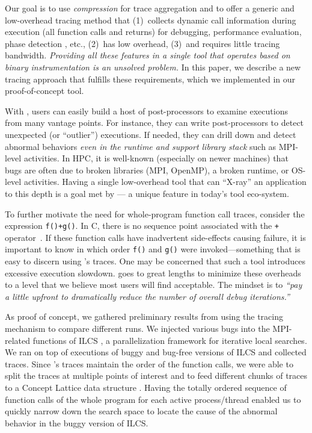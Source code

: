%
Our goal is to use \textit{compression} for trace aggregation and to offer
a generic and low-overhead tracing method that
(1)~collects dynamic call information during execution (all function calls and returns) for debugging, performance evaluation, phase detection \cite{cbb}, etc.,
(2)~has low overhead,
(3)~and requires little tracing bandwidth.
%
{\em Providing all these features in a single tool
that operates based on binary instrumentation
is an unsolved problem.}
%
In this paper, we describe a new tracing approach that fulfills these requirements, which we implemented in our proof-of-concept \parlot tool.


%
With \parlot, users can easily build a host of post-processors to examine
executions from many vantage points.
%
For instance, they can write post-processors
to detect unexpected (or ``outlier'') executions.
%
If needed, they can
drill down and detect abnormal behaviors {\em even in the runtime and
support library stack} such as MPI-level activities.
%
In HPC, it is well-known (especially on newer machines) that bugs are often due to
broken libraries (MPI, OpenMP), a broken runtime, or OS-level activities.
%
Having a single low-overhead tool that can ``X-ray'' an application to this depth is a goal met by \parlot --- a unique feature in today's tool eco-system.

To further motivate the need for whole-program function call
traces, consider the expression {\tt f()+g()}.
%
In C, there is no sequence point associated with the {\tt +}
operator~\cite{sequence-points-in-C}.
%
If these function calls have inadvertent side-effects causing
failure, it is important to know in which order {\tt f()}
and {\tt g()} were invoked---something that is easy to discern using
\parlot 's traces.
%
One may be concerned that such a tool introduces excessive execution slowdown.
%
\parlot goes to great lengths to minimize these overheads to a level that we believe most users will find acceptable. The mindset is to \textit{``pay a little upfront to dramatically reduce the number of overall debug iterations.''}

%
As proof of concept, we gathered preliminary results from using the \parlot tracing mechanism to compare different runs.
%
We injected various bugs into the MPI-related functions of ILCS \cite{ilcs}, a parallelization framework for iterative local searches.
%
We ran \parlot on top of executions of buggy and bug-free versions of ILCS and collected traces.
%
Since \parlot's traces maintain the order of the function calls, we were able to split the traces at multiple points of interest and to feed different chunks of traces to a Concept Lattice data structure \cite{clbook} \cite{clconst}.
%
Having the totally ordered sequence of function calls of the whole program for each active process/thread enabled us to quickly narrow down the search space to locate the cause of the abnormal behavior in the buggy version of ILCS.

